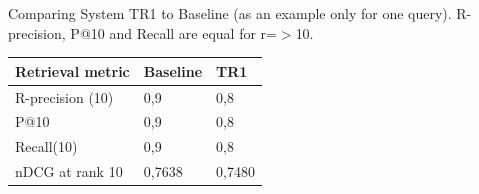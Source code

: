 \documentclass[a4paper,11pt]{article}
\begin{document}
Comparing System TR1 to Baseline (as an example only for one query). R-precision, P@10 and Recall are equal for r=$>$10.
\newline

\begin{tabular}{|l|l|l|}
\hline
\textbf{Retrieval metric} & \textbf{Baseline} & \textbf{TR1} \\ \hline
R-precision (10) & 0,9 & 0,8 \\ \hline
P@10 & 0,9 & 0,8 \\ \hline
Recall(10) & 0,9 & 0,8 \\ \hline
nDCG at rank 10 & 0,7638 & 0,7480 \\ \hline
\end{tabular}
\end{document}
